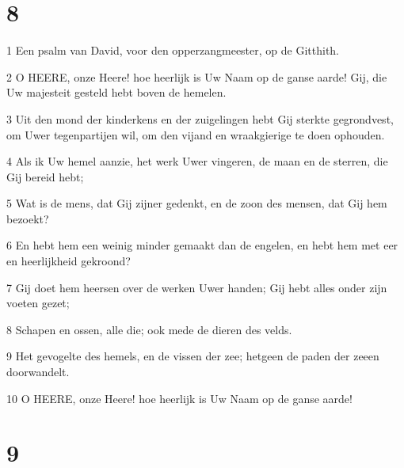 \chapter{8}

\par 1 Een psalm van David, voor den opperzangmeester, op de Gitthith.
\par 2 O HEERE, onze Heere! hoe heerlijk is Uw Naam op de ganse aarde! Gij, die Uw majesteit gesteld hebt boven de hemelen.
\par 3 Uit den mond der kinderkens en der zuigelingen hebt Gij sterkte gegrondvest, om Uwer tegenpartijen wil, om den vijand en wraakgierige te doen ophouden.
\par 4 Als ik Uw hemel aanzie, het werk Uwer vingeren, de maan en de sterren, die Gij bereid hebt;
\par 5 Wat is de mens, dat Gij zijner gedenkt, en de zoon des mensen, dat Gij hem bezoekt?
\par 6 En hebt hem een weinig minder gemaakt dan de engelen, en hebt hem met eer en heerlijkheid gekroond?
\par 7 Gij doet hem heersen over de werken Uwer handen; Gij hebt alles onder zijn voeten gezet;
\par 8 Schapen en ossen, alle die; ook mede de dieren des velds.
\par 9 Het gevogelte des hemels, en de vissen der zee; hetgeen de paden der zeeen doorwandelt.
\par 10 O HEERE, onze Heere! hoe heerlijk is Uw Naam op de ganse aarde!

\chapter{9}

